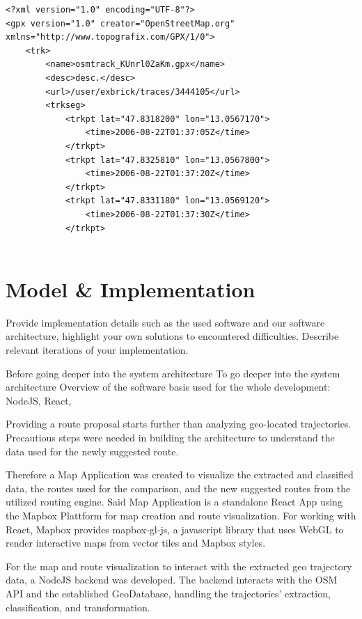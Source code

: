 \begin{lstlisting}
<?xml version="1.0" encoding="UTF-8"?>
<gpx version="1.0" creator="OpenStreetMap.org" xmlns="http://www.topografix.com/GPX/1/0">
    <trk>
        <name>osmtrack_KUnrl0ZaKm.gpx</name>
        <desc>desc.</desc>
        <url>/user/exbrick/traces/3444105</url>
        <trkseg>
            <trkpt lat="47.8318200" lon="13.0567170">
                <time>2006-08-22T01:37:05Z</time>
            </trkpt>
            <trkpt lat="47.8325810" lon="13.0567800">
                <time>2006-08-22T01:37:20Z</time>
            </trkpt>
            <trkpt lat="47.8331180" lon="13.0569120">
                <time>2006-08-22T01:37:30Z</time>
            </trkpt>
            
\end{lstlisting}

\section{Model & Implementation}

Provide implementation details such as the used software and our software architecture, highlight your own solutions to encountered difficulties. Describe relevant iterations of your implementation.

Before going deeper into the system architecture 
To go deeper into the system architecture 
Overview of the software basis used for the whole development: 
NodeJS, React,

Providing a route proposal starts further than analyzing geo-located trajectories. Precautious steps were needed in building the architecture to understand the data used for the newly suggested route. 

Therefore a Map Application was created to visualize the extracted and classified data, the routes used for the comparison, and the new suggested routes from the utilized routing engine. Said Map Application is a standalone React App using the Mapbox Plattform for map creation and route visualization. For working with React, Mapbox provides mapbox-gl-js, a javascript library that uses WebGL to render interactive maps from vector tiles and Mapbox styles.


For the map and route visualization to interact with the extracted geo trajectory data, a NodeJS backend was developed. The backend interacts with the OSM API and the established GeoDatabase, handling the trajectories' extraction, classification, and transformation.

